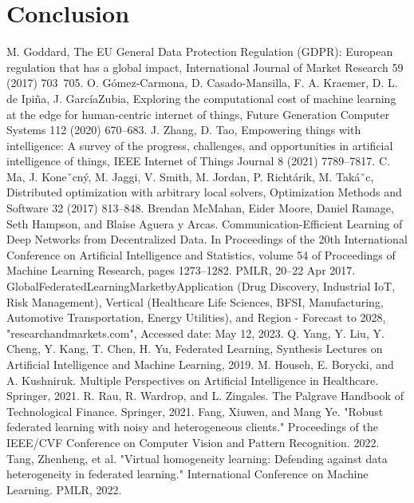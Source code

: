 \documentclass[conference]{IEEEtran}
\begin{document}
\section{Conclusion}




\begin{thebibliography}{00}
     M. Goddard, The EU General Data Protection Regulation (GDPR): European regulation that has a global impact, International Journal of Market Research 59 (2017) 703~705.
     O. Gómez-Carmona, D. Casado-Mansilla, F. A. Kraemer, D. L. de Ipiña, J. GarcíaZubia, Exploring the computational cost of machine learning at the edge for human-centric internet of things, Future Generation Computer Systems 112 (2020) 670–683.
     J. Zhang, D. Tao, Empowering things with intelligence: A survey of the progress, challenges, and opportunities in artificial intelligence of things, IEEE Internet of Things Journal 8 (2021) 7789–7817.
     C. Ma, J. Koneˇcný, M. Jaggi, V. Smith, M. Jordan, P. Richtárik, M. Takáˇc, Distributed optimization with arbitrary local solvers, Optimization Methods and Software 32 (2017) 813–848.
     Brendan McMahan, Eider Moore, Daniel Ramage, Seth Hampson, and Blaise Aguera y Arcas. Communication-Efficient Learning of Deep Networks from Decentralized Data. In Proceedings of the 20th International Conference on Artificial Intelligence and Statistics, volume 54 of Proceedings of Machine Learning Research, pages 1273–1282. PMLR, 20–22 Apr 2017.
     GlobalFederatedLearningMarketbyApplication (Drug Discovery, Industrial IoT, Risk Management), Vertical (Healthcare  Life Sciences, BFSI, Manufacturing, Automotive Transportation, Energy  Utilities), and Region - Forecast to 2028, "researchandmarkets.com", Accessed date: May 12, 2023.
     Q. Yang, Y. Liu, Y. Cheng, Y. Kang, T. Chen, H. Yu, Federated Learning, Synthesis Lectures on Artificial Intelligence and Machine Learning, 2019.
     M. Househ, E. Borycki, and A. Kushniruk. Multiple Perspectives on Artificial Intelligence in Healthcare. Springer, 2021.
     R. Rau, R. Wardrop, and L. Zingales. The Palgrave Handbook of Technological Finance. Springer, 2021.
     Fang, Xiuwen, and Mang Ye. "Robust federated learning with noisy and heterogeneous clients." Proceedings of the IEEE/CVF Conference on Computer Vision and Pattern Recognition. 2022.
     Tang, Zhenheng, et al. "Virtual homogeneity learning: Defending against data heterogeneity in federated learning." International Conference on Machine Learning. PMLR, 2022.

\end{thebibliography}
\end{document}
